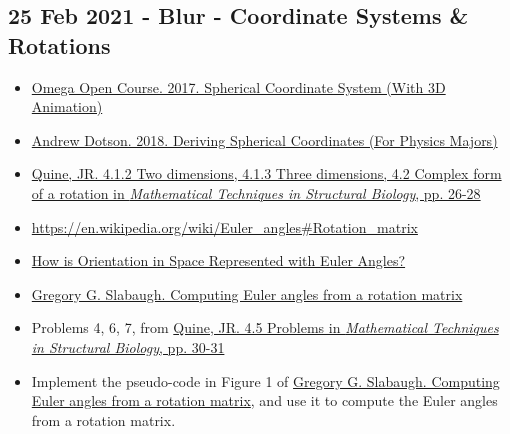 \documentclass[11pt, oneside]{article}   	%
\begin{document}
\subsection{25 Feb 2021 - Blur - Coordinate Systems \& Rotations}
\begin{itemize}
	\item \href{https://youtu.be/FDyenWWlPdU}{Omega Open Course. 2017. Spherical Coordinate System (With 3D Animation)}
	\item \href{https://youtu.be/w79nZGzWMyI}{Andrew Dotson. 2018. Deriving Spherical Coordinates (For Physics Majors)}
	\item \href{https://accio.github.io/AMIDD/assets/2020/04/JRQuine-MathBiophysicsBook.pdf}{Quine, JR. 4.1.2 Two dimensions, 4.1.3 Three dimensions, 4.2 Complex form of a rotation in {\it  Mathematical Techniques in Structural Biology},  pp. 26-28}
	\item \url{https://en.wikipedia.org/wiki/Euler_angles#Rotation_matrix}
	\item \href{https://www.mecademic.com/en/how-is-orientation-in-space-represented-with-euler-angles}{How is Orientation in Space Represented with Euler Angles?}
	\item \href{http://www.gregslabaugh.net/publications/euler.pdf}{Gregory G. Slabaugh. Computing Euler angles from a rotation matrix}
\end{itemize}

\begin{itemize}
	\item Problems 4, 6, 7, from \href{https://accio.github.io/AMIDD/assets/2020/04/JRQuine-MathBiophysicsBook.pdf}{Quine, JR. 4.5 Problems  in {\it  Mathematical Techniques in Structural Biology},  pp. 30-31}
	\item Implement the pseudo-code in Figure 1 of \href{http://www.gregslabaugh.net/publications/euler.pdf}{Gregory G. Slabaugh. Computing Euler angles from a rotation matrix}, and use it to compute the Euler angles from a rotation matrix.
\end{itemize}
\end{document}
